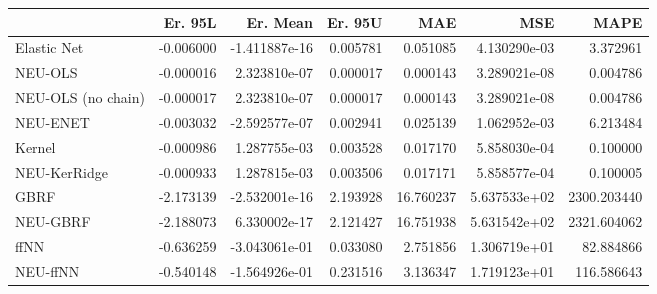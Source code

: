 \begin{tabular}{lrrrrrr}
\toprule
{} &   Er. 95L &      Er. Mean &   Er. 95U &        MAE &           MSE &         MAPE \\
\midrule
Elastic Net        & -0.006000 & -1.411887e-16 &  0.005781 &   0.051085 &  4.130290e-03 &     3.372961 \\
NEU-OLS            & -0.000016 &  2.323810e-07 &  0.000017 &   0.000143 &  3.289021e-08 &     0.004786 \\
NEU-OLS (no chain) & -0.000017 &  2.323810e-07 &  0.000017 &   0.000143 &  3.289021e-08 &     0.004786 \\
NEU-ENET           & -0.003032 & -2.592577e-07 &  0.002941 &   0.025139 &  1.062952e-03 &     6.213484 \\
Kernel             & -0.000986 &  1.287755e-03 &  0.003528 &   0.017170 &  5.858030e-04 &     0.100000 \\
NEU-KerRidge       & -0.000933 &  1.287815e-03 &  0.003506 &   0.017171 &  5.858577e-04 &     0.100005 \\
GBRF               & -2.173139 & -2.532001e-16 &  2.193928 &  16.760237 &  5.637533e+02 &  2300.203440 \\
NEU-GBRF           & -2.188073 &  6.330002e-17 &  2.121427 &  16.751938 &  5.631542e+02 &  2321.604062 \\
ffNN               & -0.636259 & -3.043061e-01 &  0.033080 &   2.751856 &  1.306719e+01 &    82.884866 \\
NEU-ffNN           & -0.540148 & -1.564926e-01 &  0.231516 &   3.136347 &  1.719123e+01 &   116.586643 \\
\bottomrule
\end{tabular}
